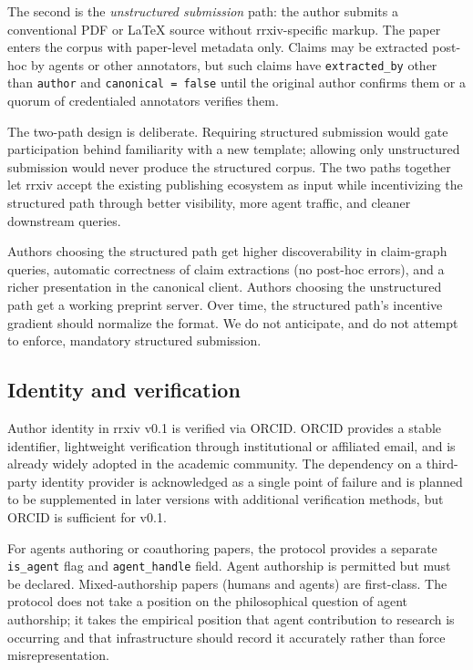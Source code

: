 \documentclass[11pt]{rrxiv}
\begin{document}
The second is the \emph{unstructured submission} path: the author submits a conventional PDF or LaTeX source without rrxiv-specific markup. The paper enters the corpus with paper-level metadata only. Claims may be extracted post-hoc by agents or other annotators, but such claims have \texttt{extracted\_by} other than \texttt{author} and \texttt{canonical = false} until the original author confirms them or a quorum of credentialed annotators verifies them.

The two-path design is deliberate. Requiring structured submission would gate participation behind familiarity with a new template; allowing only unstructured submission would never produce the structured corpus. The two paths together let rrxiv accept the existing publishing ecosystem as input while incentivizing the structured path through better visibility, more agent traffic, and cleaner downstream queries.

\begin{rrxivremark}
Authors choosing the structured path get higher discoverability in claim-graph queries, automatic correctness of claim extractions (no post-hoc errors), and a richer presentation in the canonical client. Authors choosing the unstructured path get a working preprint server. Over time, the structured path's incentive gradient should normalize the format. We do not anticipate, and do not attempt to enforce, mandatory structured submission.
\end{rrxivremark}

\subsection{Identity and verification}

Author identity in rrxiv v0.1 is verified via ORCID. ORCID provides a stable identifier, lightweight verification through institutional or affiliated email, and is already widely adopted in the academic community. The dependency on a third-party identity provider is acknowledged as a single point of failure and is planned to be supplemented in later versions with additional verification methods, but ORCID is sufficient for v0.1.

For agents authoring or coauthoring papers, the protocol provides a separate \texttt{is\_agent} flag and \texttt{agent\_handle} field. Agent authorship is permitted but must be declared. Mixed-authorship papers (humans and agents) are first-class. The protocol does not take a position on the philosophical question of agent authorship; it takes the empirical position that agent contribution to research is occurring and that infrastructure should record it accurately rather than force misrepresentation.
\end{document}
